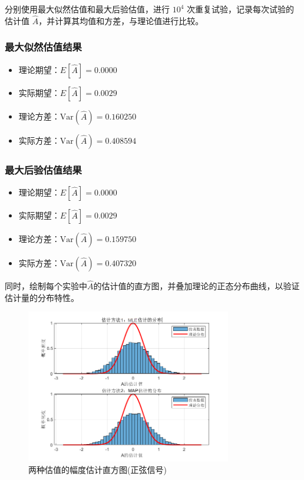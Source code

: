 \documentclass[12pt]{ctexart}
\begin{document}
分别使用最大似然估值和最大后验估值，进行 \( 10^4 \) 次重复试验，记录每次试验的估计值 \( \hat{A} \)，并计算其均值和方差，与理论值进行比较。

\subsubsection*{最大似然估值结果}

\begin{itemize}
    \item 理论期望：\( E[\hat{A}] = 0.0000 \)
    \item 实际期望：\( E[\hat{A}] = 0.0029 \)
    \item 理论方差：\( \text{Var}(\hat{A}) = 0.160250 \)
    \item 实际方差：\( \text{Var}(\hat{A}) = 0.408594 \)
\end{itemize}

\subsubsection*{最大后验估值结果}

\begin{itemize}
    \item 理论期望：\( E[\hat{A}] = 0.0000 \)
    \item 实际期望：\( E[\hat{A}] = 0.0029 \)
    \item 理论方差：\( \text{Var}(\hat{A}) = 0.159750 \)
    \item 实际方差：\( \text{Var}(\hat{A}) = 0.407320 \)
\end{itemize}

同时，绘制每个实验中$\hat A$的估计值的直方图，并叠加理论的正态分布曲线，以验证估计量的分布特性。

\begin{figure}[H]
    \centering
    \includegraphics[width=0.8\textwidth]{image/output3.png}
    \caption{两种估值的幅度估计直方图(正弦信号)}
\end{figure}
\end{document}
